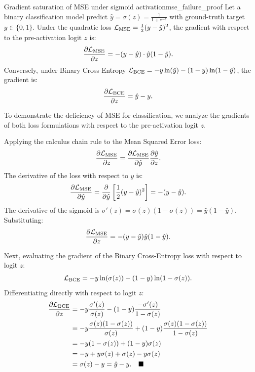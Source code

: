 \documentclass[../../main.tex]{subfiles}
\begin{document}
\begin{theorem}{Gradient saturation of MSE under sigmoid activation}{mse_failure_proof}
Let a binary classification model predict $\hat{y} = \sigma(z) = \frac{1}{1 + e^{-z}}$ with ground-truth target $y \in \{0, 1\}$. Under the quadratic loss $\mathcal{L}_{\text{MSE}} = \frac{1}{2}(y - \hat{y})^2$, the gradient with respect to the pre-activation logit $z$ is:
\begin{equation}
\label{eq:mse_gradient_sat}
\frac{\partial \mathcal{L}_{\text{MSE}}}{\partial z} = - (y - \hat{y}) \cdot \hat{y}(1 - \hat{y}).
\end{equation}
Conversely, under Binary Cross-Entropy $\mathcal{L}_{\text{BCE}} = - y \ln(\hat{y}) - (1 - y) \ln(1 - \hat{y})$, the gradient is:
\begin{equation}
\label{eq:bce_gradient_clean}
\frac{\partial \mathcal{L}_{\text{BCE}}}{\partial z} = \hat{y} - y.
\end{equation}
\end{theorem}

To demonstrate the deficiency of MSE for classification, we analyze the gradients of both loss formulations with respect to the pre-activation logit $z$.

Applying the calculus chain rule to the Mean Squared Error loss:
\begin{equation}
\frac{\partial \mathcal{L}_{\text{MSE}}}{\partial z} = \frac{\partial \mathcal{L}_{\text{MSE}}}{\partial \hat{y}} \frac{\partial \hat{y}}{\partial z}.
\end{equation}
The derivative of the loss with respect to $\hat{y}$ is:
\[
\frac{\partial \mathcal{L}_{\text{MSE}}}{\partial \hat{y}} = \frac{\partial}{\partial \hat{y}} \left[ \frac{1}{2}(y - \hat{y})^2 \right] = -(y - \hat{y}).
\]
The derivative of the sigmoid is $\sigma'(z) = \sigma(z)(1 - \sigma(z)) = \hat{y}(1 - \hat{y})$. Substituting:
\begin{equation}
\frac{\partial \mathcal{L}_{\text{MSE}}}{\partial z} = -(y - \hat{y}) \hat{y}(1 - \hat{y}). \label{eq:mse_grad_derived}
\end{equation}

Next, evaluating the gradient of the Binary Cross-Entropy loss with respect to logit $z$:
\begin{equation}
\mathcal{L}_{\text{BCE}} = - y \ln(\sigma(z)) - (1 - y) \ln(1 - \sigma(z)).
\end{equation}
Differentiating directly with respect to logit $z$:
\begin{align*}
\frac{\partial \mathcal{L}_{\text{BCE}}}{\partial z} &= - y \frac{\sigma'(z)}{\sigma(z)} - (1 - y) \frac{-\sigma'(z)}{1 - \sigma(z)} \\
&= - y \frac{\sigma(z)(1 - \sigma(z))}{\sigma(z)} + (1 - y) \frac{\sigma(z)(1 - \sigma(z))}{1 - \sigma(z)} \\
&= - y (1 - \sigma(z)) + (1 - y) \sigma(z) \\
&= - y + y \sigma(z) + \sigma(z) - y \sigma(z) \\
&= \sigma(z) - y = \hat{y} - y. \quad \blacksquare
\end{align*}
\end{document}
